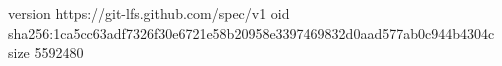 version https://git-lfs.github.com/spec/v1
oid sha256:1ca5cc63adf7326f30e6721e58b20958e3397469832d0aad577ab0c944b4304c
size 5592480
